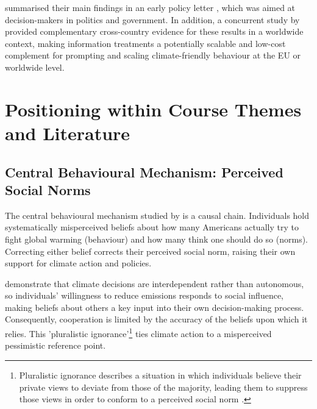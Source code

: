 \documentclass[11pt,a4paper]{scrartcl}
\numberwithin{equation}{section}
\theoremstyle{definition}
\theoremstyle{remark}
\begin{document}
    \textcite{andre2024} summarised their main findings in an early policy letter \parencite[][]{andre2021}, which was aimed at decision-makers in politics and government. In addition, a concurrent study by \textcite{andre2024globally} provided complementary cross-country evidence for these results in a worldwide context, making information treatments a potentially scalable and low-cost complement for prompting and scaling climate-friendly behaviour at the EU or worldwide level.
    
\section{Positioning within Course Themes and Literature}
\label{sec:Positioning within Course Themes and Literature}

\subsection{Central Behavioural Mechanism: Perceived Social Norms}
\label{subsec:Central Behavioural Mechanism}

    The central behavioural mechanism studied by \textcite{andre2024} is a causal chain. Individuals hold systematically misperceived beliefs about how many Americans actually try to fight global warming (behaviour) and how many think one should do so (norms). Correcting either belief corrects their perceived social norm, raising their own support for climate action and policies.
    
    \textcite{GANGULI2026} demonstrate that climate decisions are interdependent rather than autonomous, so individuals' willingness to reduce emissions responds to social influence, making beliefs about others a key input into their own decision-making process. Consequently, cooperation is limited by the accuracy of the beliefs upon which it relies. This 'pluralistic ignorance'\footnote{Pluralistic ignorance describes a situation in which individuals believe their private views to deviate from those of the majority, leading them to suppress those views in order to conform to a perceived social norm \parencite{pilat2023}.} ties climate action to a misperceived pessimistic reference point.
    
\end{document}
